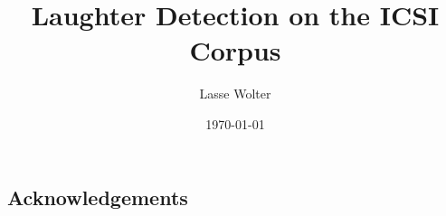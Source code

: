 \documentclass[bsc,frontabs,parskip,deptreport]{infthesis}
\begin{document}
\begin{preliminary}
\title{Laughter Detection on the ICSI Corpus}

\author{Lasse Wolter}



\date{\today}

\abstract{

}

\maketitle

\section*{Acknowledgements}


\setcounter{tocdepth}{1} %
\tableofcontents
\end{preliminary}


\end{document}
